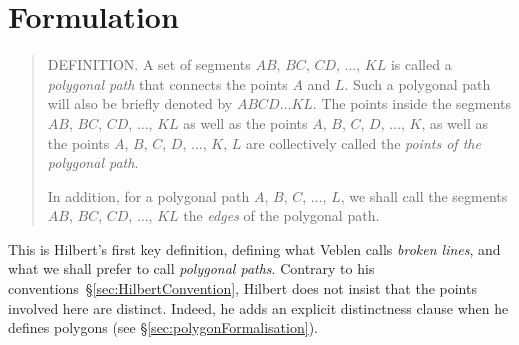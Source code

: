 



\section{Formulation}\label{sec:JordanFormulation}
\begin{quote}
  DEFINITION. A set of segments $AB$, $BC$, $CD$, $\ldots$, $KL$ is called a \emph{polygonal path} that connects the points $A$ and $L$. Such a polygonal path will also be briefly denoted by $ABCD\ldots KL$. The points inside the segments $AB$, $BC$, $CD$, $\ldots$, $KL$ as well as the points $A$, $B$, $C$, $D$, $\ldots$, $K$, as well as the points $A$, $B$, $C$, $D$, $\ldots$, $K$, $L$ are collectively called the \emph{points of the polygonal path}. 

In addition, for a polygonal path $A$, $B$, $C$, $\ldots$, $L$, we shall call the segments $AB$, $BC$, $CD$, $\dots$, $KL$ the \emph{edges} of the polygonal path.

\end{quote}
This is Hilbert's first key definition, defining what Veblen calls \emph{broken lines}, and what we shall prefer to call \emph{polygonal paths}. Contrary to his conventions~\S\ref{sec:HilbertConvention}, Hilbert does not insist that the points involved here are distinct. Indeed, he adds an explicit distinctness clause when he defines polygons (see \S\ref{sec:polygonFormalisation}).

